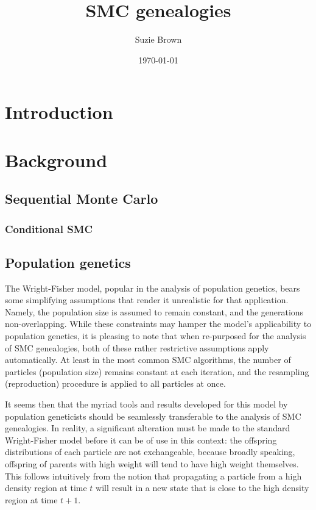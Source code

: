 \documentclass{article}
\title{SMC genealogies}
\author{Suzie Brown}
\date{\today}
\begin{document}
\maketitle

\section{Introduction}

\section{Background}

\subsection{Sequential Monte Carlo}

\subsubsection{Conditional SMC}

\subsection{Population genetics}
The Wright-Fisher model, popular in the analysis of population genetics, bears some simplifying assumptions that render it unrealistic for that application. Namely, the population size is assumed to remain constant, and the generations non-overlapping. While these constraints may hamper the model's applicability to population genetics, it is pleasing to note that when re-purposed for the analysis of SMC genealogies, both of these rather restrictive assumptions apply automatically. At least in the most common SMC algorithms, the number of particles (population size) remains constant at each iteration, and the resampling (reproduction) procedure is applied to all particles at once.

It seems then that the myriad tools and results developed for this model by population geneticists should be seamlessly transferable to the analysis of SMC genealogies. In reality, a significant alteration must be made to the standard Wright-Fisher model before it can be of use in this context: the offspring distributions of each particle are not exchangeable, because broadly speaking, offspring of parents with high weight will tend to have high weight themselves. This follows intuitively from the notion that propagating a particle from a high density region at time $t$ will result in a new state that is close to the high density region at time $t+1$.
\end{document}
